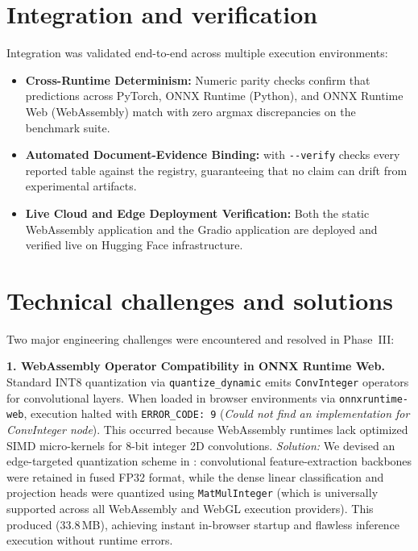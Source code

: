 \documentclass[12pt,a4paper]{report}
\begin{document}
\section{Integration and verification}

Integration was validated end-to-end across multiple execution environments:
\begin{itemize}[leftmargin=1.4em,itemsep=2pt]
\item \textbf{Cross-Runtime Determinism:} Numeric parity checks confirm that predictions across PyTorch,
      ONNX Runtime (Python), and ONNX Runtime Web (WebAssembly) match with zero argmax discrepancies on the benchmark suite.
\item \textbf{Automated Document-Evidence Binding:}  with \texttt{-{}-verify} checks every
      reported table against the registry, guaranteeing that no claim can drift from experimental artifacts.
\item \textbf{Live Cloud and Edge Deployment Verification:} Both the static WebAssembly application
      and the Gradio application are deployed and verified live on Hugging Face infrastructure.
\end{itemize}

\section{Technical challenges and solutions}

Two major engineering challenges were encountered and resolved in Phase~III:

\textbf{1. WebAssembly Operator Compatibility in ONNX Runtime Web.} Standard INT8 quantization via
\texttt{quantize\_dynamic} emits \texttt{ConvInteger} operators for convolutional layers. When loaded
in browser environments via \texttt{onnxruntime-web}, execution halted with \texttt{ERROR\_CODE: 9}
(\emph{Could not find an implementation for ConvInteger node}). This occurred because WebAssembly
runtimes lack optimized SIMD micro-kernels for 8-bit integer 2D convolutions.
\emph{Solution:} We devised an edge-targeted quantization scheme in :
convolutional feature-extraction backbones were retained in fused FP32 format, while the dense linear
classification and projection heads were quantized using \texttt{MatMulInteger} (which is universally
supported across all WebAssembly and WebGL execution providers). This produced
 (33.8\,MB), achieving instant in-browser startup and flawless
inference execution without runtime errors.
\end{document}
